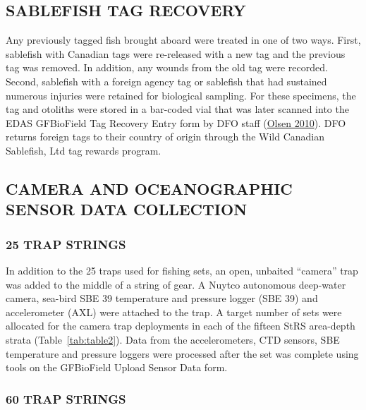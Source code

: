 \documentclass[12pt]{article}\usepackage[]{graphicx}\usepackage[]{color}
\begin{document}
\hypertarget{sablefish-tag-recovery}{%
\subsection{SABLEFISH TAG RECOVERY}\label{sablefish-tag-recovery}}

Any previously tagged fish brought aboard were treated in one of two ways. First, sablefish with Canadian tags were re-released with a new tag and the previous tag was removed. In addition, any wounds from the old tag were recorded. Second, sablefish with a foreign agency tag or sablefish that had sustained numerous injuries were retained for biological sampling. For these specimens, the tag and otoliths were stored in a bar-coded vial that was later scanned into the EDAS GFBioField Tag Recovery Entry form by DFO staff (\protect\hyperlink{ref-Olsen2010}{Olsen 2010}). DFO returns foreign tags to their country of origin through the Wild Canadian Sablefish, Ltd tag rewards program.

\hypertarget{camera-and-oceanographic-sensor-data-collection}{%
\subsection{CAMERA AND OCEANOGRAPHIC SENSOR DATA COLLECTION}\label{camera-and-oceanographic-sensor-data-collection}}

\hypertarget{trap-strings}{%
\subsubsection{25 TRAP STRINGS}\label{trap-strings}}

In addition to the 25 traps used for fishing sets, an open, unbaited ``camera'' trap was added to the middle of a string of gear. A Nuytco autonomous deep-water camera, sea-bird SBE 39 temperature and pressure logger (SBE 39) and accelerometer (AXL) were attached to the trap. A target number of sets were allocated for the camera trap deployments in each of the fifteen StRS area-depth strata (Table~\ref{tab:table2}). Data from the accelerometers, CTD sensors, SBE temperature and pressure loggers were processed after the set was complete using tools on the GFBioField Upload Sensor Data form.

\hypertarget{trap-strings-1}{%
\subsubsection{60 TRAP STRINGS}\label{trap-strings-1}}
\end{document}
